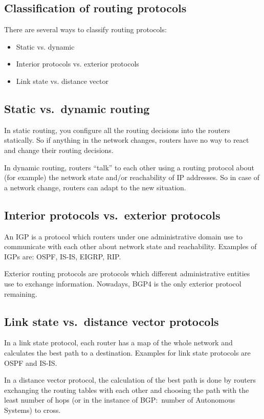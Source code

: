 \subsection{Classification of routing protocols}
There are several ways to classify routing protocols:
\begin{itemize}
  \item Static vs. dynamic
  \item Interior protocols vs. exterior protocols
  \item Link state vs. distance vector
\end{itemize}

\subsection{Static vs.\ dynamic routing}
In static routing, you configure all the routing decisions into the routers
statically. So if anything in the network changes, routers have no
way to react and change their routing decisions.

In dynamic routing, routers ``talk'' to each other using a routing protocol
about (for example) the network state and/or reachability of IP addresses. So
in case of a network change, routers can adapt to the new situation.

\subsection{Interior protocols vs.\ exterior protocols}
An \acrfull{IGP} is a protocol which routers under one administrative domain use to communicate with each other about network state and reachability. Examples of \glspl{IGP}
are: \gls{OSPF}, \gls{IS-IS}, \gls{EIGRP}, \gls{RIP}.

Exterior routing protocols are protocols which different administrative entities
use to exchange information. Nowadays, BGP4 is the only exterior protocol
remaining.

\subsection{Link state vs.\ distance vector protocols}
In a link state protocol, each router has a map of the whole network and calculates
the best path to a destination. Examples for link state protocols are OSPF and IS-IS.

In a distance vector protocol, the calculation of the best path is done by routers exchanging
the routing tables with each other and choosing the path with the least number
of hops (or in the instance of BGP:\ number of Autonomous Systems) to cross.

